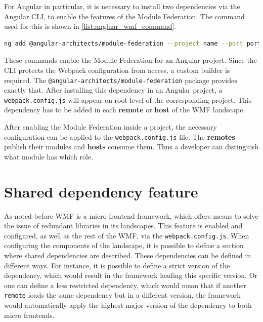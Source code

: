 For Angular in particular, it is necessary to install two dependencies via the Angular CLI, to enable the features of the Module Federation. The command used for this is shown in \ref{list:angluar_wmf_command}. 

\begin{lstlisting}[language=Bash, caption=Angular CLI console command to enable Module Federation in an Angular project, label=list:angluar_wmf_command,  xleftmargin=.01\textwidth, xrightmargin=.01\textwidth]
	ng add @angular-architects/module-federation --project name --port port
\end{lstlisting}

These commands enable the Module Federation for an Angular project. Since the CLI protects the Webpack configuration from access, a custom builder is required. The \texttt{@angular-architects/module-federation} package provides exactly that.
After installing this dependency in an Angular project, a \texttt{webpack.config.js} will appear on root level of the corresponding project.\cite{wmf_angular_dependency_install}
This dependency has to be added in each \textbf{remote} or \textbf{host} of the WMF landscape. 

After enabling the Module Federation inside a project, the necessary configuration can be applied to the \texttt{webpack.config.js} file. The \textbf{remotes} publish their modules and \textbf{hosts} consume them. Thus a developer can distinguish what module has which role.

\section{Shared dependency feature}

As noted before WMF is a micro frontend framework, which offers means to solve the issue of redundant libraries in its landscapes.
This feature is enabled and configured, as well as the rest of the WMF, via the \texttt{webpack.config.js}. When configuring the components of the landscape, it is possible to define a section where shared dependencies are described. These dependencies can be defined in different ways. For instance, it is possible to define a strict version of the dependency, which would result in the framework loading this specific version. Or one can define a less restricted dependency, which would mean that if another \texttt{remote} loads the same dependency but in a different version, the framework would automatically apply the highest major version of the dependency to both micro frontends.

